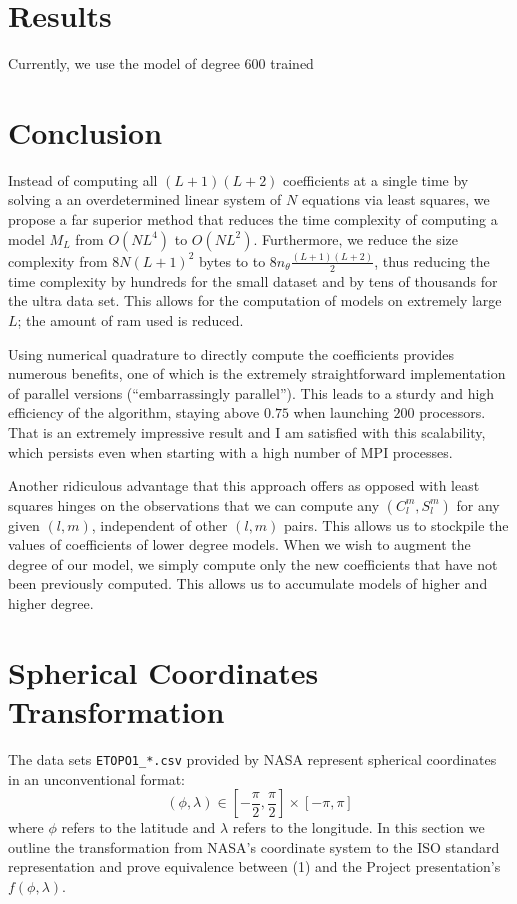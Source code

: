 \documentclass[a4paper]{article}
\theoremstyle{definition}
\begin{document}
\section{Results}

Currently, we use the model of degree 600 trained


\section{Conclusion}

    Instead of computing all $(L + 1)(L + 2)$ coefficients at a single time by solving a an overdetermined linear system of $N$ equations
    via least squares, we propose a far superior method that reduces the time complexity of computing a model $M_L$ from $O(NL^4)$ to 
    $O(NL^2)$. Furthermore, we reduce the size complexity from $8N(L + 1)^2$ bytes to to $8n_\theta\frac{(L + 1)(L + 2)}{2}$, thus reducing the time 
    complexity by hundreds for the small dataset and by tens of thousands for the ultra data set. This allows for the computation of models
    on extremely large $L$; the amount of ram used is reduced.

    Using numerical quadrature to directly compute the coefficients provides numerous benefits, one of which is the extremely straightforward implementation 
    of parallel versions (``embarrassingly parallel''). This leads to a sturdy and high efficiency of the algorithm, staying above $0.75$ when launching 
    $200$ processors. That is an extremely impressive result and I am satisfied with this scalability, which persists even when starting with a high number of MPI processes.

    Another ridiculous advantage that this approach offers as opposed with least squares hinges on the observations that we can compute any $(C_l^m, S_l^m)$ for any given
    $(l, m)$, independent of other $(l, m)$ pairs. This allows us to stockpile the values of coefficients of lower degree models. When we wish to augment the degree of our model,
    we simply compute only the new coefficients that have not been previously computed. This allows us to accumulate models of higher and higher degree.


\appendix
\section{Spherical Coordinates Transformation}

The data sets \verb|ETOPO1_*.csv| provided by NASA represent spherical coordinates in an unconventional format: $$(\phi, \lambda) \in [-\frac{\pi}{2}, \frac{\pi}{2}] \times [-\pi, \pi] $$ where $\phi$ refers to the latitude
and $\lambda$ refers to the longitude. In this section we outline the transformation from NASA's coordinate system to the ISO standard representation and prove equivalence between (1) and the Project presentation's $f(\phi, \lambda)$.
\end{document}
